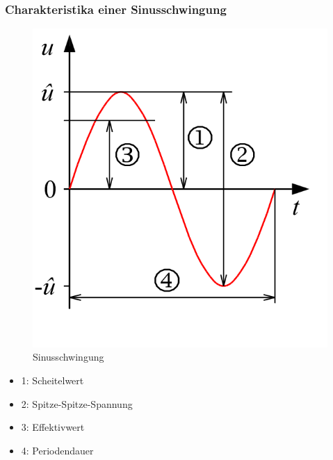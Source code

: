 \begin{frame}
	\frametitle{Charakteristika einer Sinusschwingung}
	\begin{minipage}{0.4\textwidth}
		\begin{figure}
			\includegraphics[height=0.75\textheight,keepaspectratio]{e02/Wechselspannung.png}
			\caption{Sinusschwingung \cite{sinus}}
			\label{fig_sinus}
		\end{figure}
	\end{minipage}
	\begin{minipage}{0.5\textwidth}
			\begin{itemize}
				\item 1: Scheitelwert
				\item 2: Spitze-Spitze-Spannung
				\item 3: Effektivwert
				\item 4: Periodendauer
			\end{itemize}
	\end{minipage}
\end{frame}
